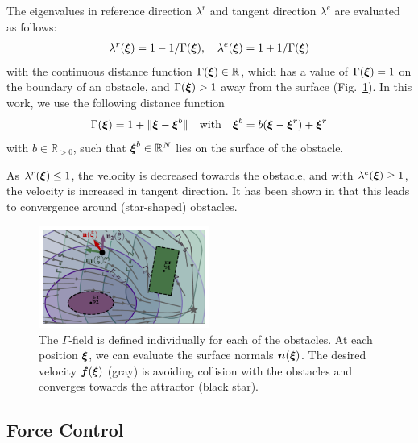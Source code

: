The eigenvalues in reference direction $\lambda^r$ and tangent direction $\lambda^e$ are evaluated as follows:
\begin{equation}
\begin{split}
    \lambda^r(\vecs \xi) = 1 - 1 /\Gamma(\vecs \xi) , \quad \lambda^e(\vecs \xi) = 1 + 1 / \Gamma(\vecs \xi)
    \label{eq:eigenvalues}
    \end{split}
\end{equation}
with the continuous distance function $\Gamma(\boldsymbol{\xi}) \in \mathbb{R}$, which has a value of $\Gamma(\boldsymbol{\xi}) = 1$ on the boundary of an obstacle, and $\Gamma(\boldsymbol{\xi}) > 1$ away from the surface (Fig.~\ref{fig:resultant_normal}). In this work, we use the following distance function
\begin{equation}
  \Gamma(\vecs \xi) = 1 + \| \vecs \xi - \vecs \xi^b \|  
  \quad \text{with} \quad
  \vecs \xi^b = b (\vecs \xi - \vecs \xi^r) + \vecs \xi^r
  \label{eq:distance_function}
\end{equation}
with $b \in \mathbb{R}_{>0}$, such that $\boldsymbol{\xi}^b \in \mathbb{R}^N$ lies on the surface of the obstacle.

As $\lambda^r(\boldsymbol{\xi}) \leq 1$, the velocity is decreased towards the obstacle, and with $\lambda^e(\boldsymbol{\xi}) \geq 1$, the velocity is increased in tangent direction. It has been shown in \cite{huber2022avoiding} that this leads to convergence around (star-shaped) obstacles.

\begin{figure}
\centerline{\includegraphics[width=0.5\textwidth]{figures/normal_and_gamma_field_visualization_annotated.pdf}}
\caption{
The $\Gamma$-field is defined individually for each of the obstacles. At each position $\boldsymbol{\xi}$, we can evaluate the surface normals $\boldsymbol{n}(\boldsymbol{\xi})$. 
The desired velocity $\boldsymbol{f}(\boldsymbol{\xi})$ (gray) is avoiding collision with the obstacles and converges towards the attractor (black star).}
\label{fig:resultant_normal}
\end{figure}

\subsection{Force Control}


